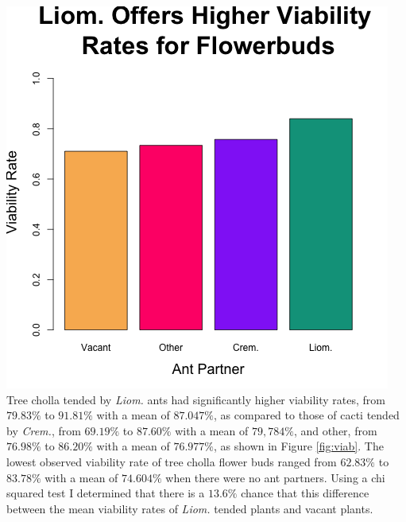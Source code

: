 \documentclass[12pt,a4paper]{article}
\begin{document}
{{\includegraphics{"Figures/viab_bars.png"}
Tree cholla tended by \textit{Liom.} ants had significantly higher viability rates, from $79.83\%$ to $91.81\%$ with a mean of $87.047\%$, as compared to those of cacti tended by \textit{Crem.}, from $69.19\%$ to $87.60\%$ with a mean of $79,784\%$, and other, from $76.98\%$ to $86.20\%$ with a mean of $76.977\%$, as shown in Figure \ref{fig:viab}. 
The lowest observed viability rate of tree cholla flower buds ranged from $62.83\%$ to $83.78\%$ with a mean of $74.604\%$ when there were no ant partners. 
Using a chi squared test I determined that there is a $13.6\%$ chance that this difference between the mean viability rates of \textit{Liom.} tended plants and vacant plants. 

}}
\end{document}
